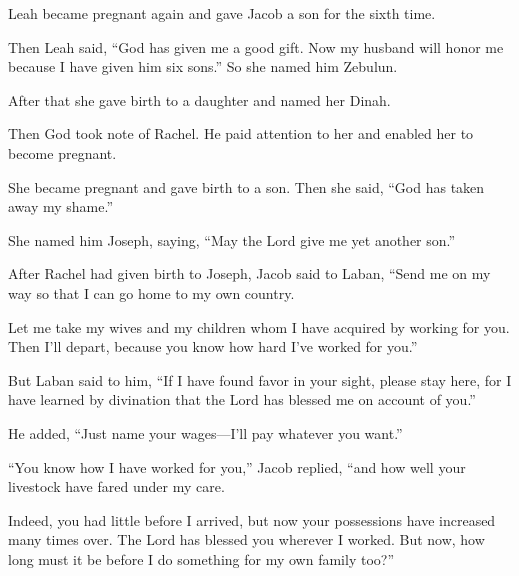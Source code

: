 \begin{scripture}
 Leah became pregnant again and gave Jacob a son for the sixth time.
 Then Leah said, ``God has given me a good gift. Now my husband will honor me because I have given him six sons.'' So she named him Zebulun.
\everypar{}

 After that she gave birth to a daughter and named her Dinah.
\everypar{}

 Then God took note of Rachel. He paid attention to her and enabled her to become pregnant.
 She became pregnant and gave birth to a son. Then she said, ``God has taken away my shame.''
 She named him Joseph, saying, ``May the Lord give me yet another son.''
\everypar{}

 After Rachel had given birth to Joseph, Jacob said to Laban, ``Send me on my way so that I can go home to my own country.
 Let me take my wives and my children whom I have acquired by working for you. Then I'll depart, because you know how hard I've worked for you.''
\everypar{}

 But Laban said to him, ``If I have found favor in your sight, please stay here, for I have learned by divination that the Lord has blessed me on account of you.''
 He added, ``Just name your wages---I'll pay whatever you want.''
\everypar{}

 ``You know how I have worked for you,'' Jacob replied, ``and how well your livestock have fared under my care.
 Indeed, you had little before I arrived, but now your possessions have increased many times over. The Lord has blessed you wherever I worked. But now, how long must it be before I do something for my own family too?''
\everypar{}


\end{scripture}
